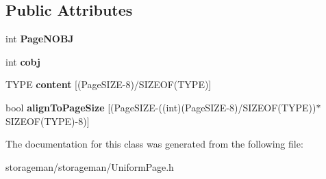 \subsection*{Public Attributes}
\begin{DoxyCompactItemize}
\item 
\hypertarget{classmia_1_1sm_1_1_uniform_page_ac8ded3984b8229ce43107757fa65b1b3}{int {\bfseries Page\-N\-O\-B\-J}}\label{classmia_1_1sm_1_1_uniform_page_ac8ded3984b8229ce43107757fa65b1b3}

\item 
\hypertarget{classmia_1_1sm_1_1_uniform_page_a8800bc6de11955973a08647a7f594a26}{int {\bfseries cobj}}\label{classmia_1_1sm_1_1_uniform_page_a8800bc6de11955973a08647a7f594a26}

\item 
\hypertarget{classmia_1_1sm_1_1_uniform_page_a3a9679234f5ab08fd13ebd13f1df8def}{T\-Y\-P\-E {\bfseries content} \mbox{[}(Page\-S\-I\-Z\-E-\/8)/S\-I\-Z\-E\-O\-F(T\-Y\-P\-E)\mbox{]}}\label{classmia_1_1sm_1_1_uniform_page_a3a9679234f5ab08fd13ebd13f1df8def}

\item 
\hypertarget{classmia_1_1sm_1_1_uniform_page_a6fa558e53ca096e2ed7eaa1ee6eafde7}{bool {\bfseries align\-To\-Page\-Size} \mbox{[}(Page\-S\-I\-Z\-E-\/((int)(Page\-S\-I\-Z\-E-\/8)/S\-I\-Z\-E\-O\-F(T\-Y\-P\-E))$\ast$S\-I\-Z\-E\-O\-F(T\-Y\-P\-E)-\/8)\mbox{]}}\label{classmia_1_1sm_1_1_uniform_page_a6fa558e53ca096e2ed7eaa1ee6eafde7}

\end{DoxyCompactItemize}


The documentation for this class was generated from the following file\-:\begin{DoxyCompactItemize}
\item 
storageman/storageman/Uniform\-Page.\-h\end{DoxyCompactItemize}
